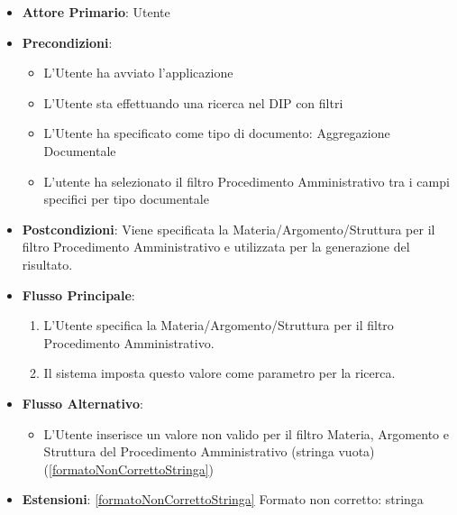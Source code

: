 \begin{itemize}
      \item \textbf{Attore Primario}: Utente
      \item \textbf{Precondizioni}: 
      \begin{itemize}            
            \item L'Utente ha avviato l'applicazione
            \item L'Utente sta effettuando una ricerca nel DIP con filtri
            \item L'Utente ha specificato come tipo di documento: Aggregazione Documentale
            \item L'utente ha selezionato il filtro Procedimento Amministrativo tra i campi specifici per tipo documentale
      \end{itemize}
      \item \textbf{Postcondizioni}: Viene specificata la Materia/Argomento/Struttura per il filtro Procedimento Amministrativo e utilizzata per la generazione del risultato.
      \item \textbf{Flusso Principale}:
      \begin{enumerate}
            \item L'Utente specifica la Materia/Argomento/Struttura per il filtro Procedimento Amministrativo.
            \item Il sistema imposta questo valore come parametro per la ricerca.
      \end{enumerate}
      \item \textbf{Flusso Alternativo}:
      \begin{itemize}
            \item L'Utente inserisce un valore non valido per il filtro Materia, Argomento e Struttura del Procedimento Amministrativo (stringa vuota) (\ref{formatoNonCorrettoStringa})
      \end{itemize}
      \item \textbf{Estensioni}: \ref{formatoNonCorrettoStringa} Formato non corretto: stringa
\end{itemize}

